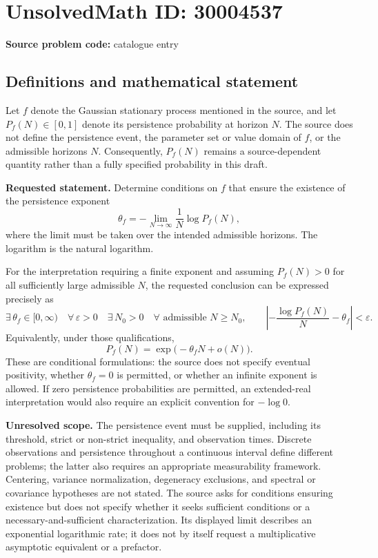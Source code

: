 \documentclass[11pt]{article}
\begin{document}
\section*{UnsolvedMath ID: 30004537}
\textbf{Source problem code:} catalogue entry
\subsection{Definitions and mathematical statement}
Let \(f\) denote the Gaussian stationary process mentioned in the source, and let \(P_f(N)\in[0,1]\) denote its persistence probability at horizon \(N\). The source does not define the persistence event, the parameter set or value domain of \(f\), or the admissible horizons \(N\). Consequently, \(P_f(N)\) remains a source-dependent quantity rather than a fully specified probability in this draft.

\textbf{Requested statement.} Determine conditions on \(f\) that ensure the existence of the persistence exponent
\[
\theta_f=-\lim_{N\to\infty}\frac{1}{N}\log P_f(N),
\]
where the limit must be taken over the intended admissible horizons. The logarithm is the natural logarithm.

For the interpretation requiring a finite exponent and assuming \(P_f(N)>0\) for all sufficiently large admissible \(N\), the requested conclusion can be expressed precisely as
\[
\exists\,\theta_f\in[0,\infty)\quad
\forall\,\varepsilon>0\quad
\exists\,N_0>0\quad
\forall\text{ admissible }N\ge N_0,\qquad
\left|-\frac{\log P_f(N)}{N}-\theta_f\right|<\varepsilon.
\]
Equivalently, under those qualifications,
\[
P_f(N)=\exp\bigl(-\theta_f N+o(N)\bigr).
\]
These are conditional formulations: the source does not specify eventual positivity, whether \(\theta_f=0\) is permitted, or whether an infinite exponent is allowed. If zero persistence probabilities are permitted, an extended-real interpretation would also require an explicit convention for \(-\log 0\).

\textbf{Unresolved scope.} The persistence event must be supplied, including its threshold, strict or non-strict inequality, and observation times. Discrete observations and persistence throughout a continuous interval define different problems; the latter also requires an appropriate measurability framework. Centering, variance normalization, degeneracy exclusions, and spectral or covariance hypotheses are not stated. The source asks for conditions ensuring existence but does not specify whether it seeks sufficient conditions or a necessary-and-sufficient characterization. Its displayed limit describes an exponential logarithmic rate; it does not by itself request a multiplicative asymptotic equivalent or a prefactor.
\end{document}
